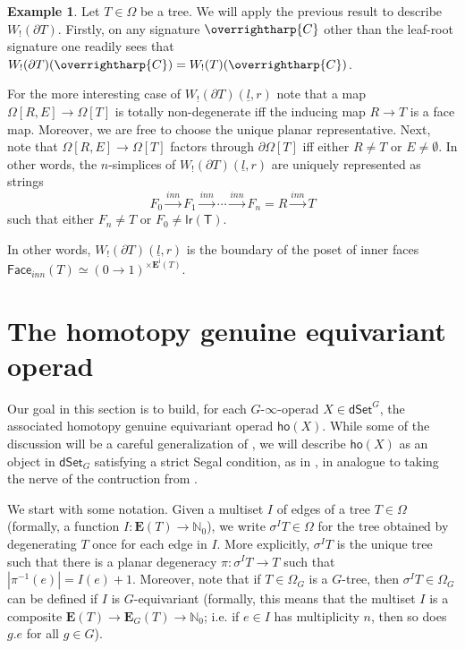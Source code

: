 \documentclass[a4paper,10pt
,draft
]{article}%
\numberwithin{equation}{section}
\numberwithin{figure}{section}
\theoremstyle{definition} %
\newtheorem{example}[equation]{Example}%
\newcommand{\vect}[1]{\text{\overrightharp{\ensuremath{#1}}}}
\newcommand{\1}{\ensuremath{\mathbbm 1}}%
\begin{document}
\begin{example}
	Let $T \in \Omega$ be a tree.
	We will apply the previous result to describe
	$W_!(\partial T)$.
	Firstly, 
	on any signature $\vect{C}$
	other than the leaf-root signature
	one readily sees that
	$W_!(\partial T)(\vect{C}) = W_!(T)(\vect{C})$.

	For the more interesting case of 
	$W_!(\partial T)(\underline{l},r)$
	note that a map
	$\Omega[R,E] \to \Omega [T]$
	is totally non-degenerate iff
	the inducing map $R \to T$
	is a face map. Moreover, we are free to choose the unique planar representative.
	Next, note that 
	$\Omega[R,E] \to \Omega [T]$
	factors through $\partial \Omega[T]$
	iff either $R \neq T$ or $E \neq \emptyset$.
	In other words, the $n$-simplices of 
	$W_!(\partial T)(\underline{l},r)$
	are uniquely represented as strings
\[
	F_0 \xrightarrow{inn} 
	F_1 \xrightarrow{inn} 
	\cdots \xrightarrow{inn}
	F_n = R \xrightarrow{inn} T
\]
such that either $F_n \neq T$ or $F_0 \neq \mathsf{lr(T)}$.

In other words, 
$W_!(\partial T)(\underline{l},r)$
is the boundary of the poset of inner faces
$\mathsf{Face}_{inn}(T) \simeq 
(0 \to 1)^{\times \boldsymbol{E}^{\mathsf{i}}(T)}.$
\end{example}








\newpage




\section{The homotopy genuine equivariant operad}
\label{HO_SEC}

Our goal in this section is to build,
for each $G$-$\infty$-operad $X \in \mathsf{dSet}^G$,
the associated homotopy genuine equivariant operad
$\mathsf{ho} (X)$.
While some of the discussion will be a careful generalization of \cite[\S 6]{MW09},
we will describe $\mathsf{ho} (X)$ as an object in
$\mathsf{dSet}_G$
satisfying a strict Segal condition, as in \cite[\S 3.3]{BP_edss},
in analogue to taking the nerve of the contruction from \cite{MW09}.

We start with some notation. 
Given a multiset $I$ of edges of a tree $T \in \Omega$
(formally, a function 
$I \colon \boldsymbol{E}(T) \to \mathbb{N}_0$),
we write $\sigma^I T \in \Omega$
for the tree obtained by degenerating $T$ once for each edge in $I$.
More explicitly, $\sigma^I T$ is the unique tree such that there is a planar degeneracy
$\pi \colon \sigma^I T \to T$
such that $|\pi^{-1}(e)| = I(e) + 1$.
Moreover,
note that if $T\in \Omega_G$ is a $G$-tree, 
then $\sigma^{I} T \in \Omega_{G}$
can be defined if $I$ is $G$-equivariant
(formally, this means that the multiset $I$ is a composite
$\boldsymbol{E}(T) \to \boldsymbol{E}_G(T)
\to \mathbb{N}_0$;
i.e. if $e \in I$ has multiplicity $n$, then so does $ g.e$ for all $g \in G$).
\end{document}
